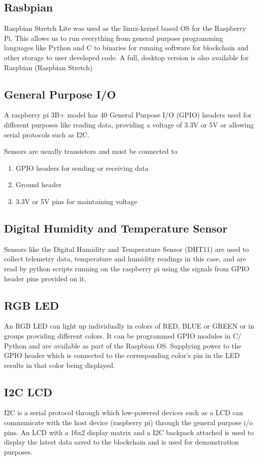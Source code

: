 \documentclass[11pt,openright]{report}
\begin{document}
\subsection{Rasbpian}
Raspbian Stretch Lite was used as the linux-kernel based OS for the Raspberry Pi. This allows us to run everything from general purpose programming languages like Python and C to binaries for running software for blockchain and other storage to user developed code. A full, desktop version is also available for Raspbian (Raspbian Stretch)

\subsection{General Purpose I/O}
A raspberry pi 3B+ model has 40 General Purpose I/O (GPIO) headers used for different purposes like reading data, providing a voltage of 3.3V or 5V or allowing serial protocols such as I2C.

Sensors are usually transistors and must be connected to
\begin{enumerate}
\item GPIO headers for sending or receiving data
\item  Ground header 
\item  3.3V or 5V pins for maintaining voltage
\end{enumerate}

\subsection{Digital Humidity and Temperature Sensor}
Sensors like the Digital Humidity and Temperature Sensor (DHT11) are used to collect telemetry data, temperature and humidity readings in this case, and are read by python scripts running on the raspberry pi using the signals from GPIO header pins provided on it.

\subsection{RGB LED}
An RGB LED can light up individually in colors of RED, BLUE or GREEN or in groups providing different colors. It can be programmed GPIO modules in C/ Python and are available as part of the Raspbian OS. Supplying power to the GPIO header which is connected to the corresponding color’s pin in the LED results in that color being displayed. 

\subsection{I2C LCD}
I2C is a serial protocol through which low-powered devices such as a LCD can communicate with the host device (raspberry pi) through the general purpose i/o pins. 
An LCD with a 16x2 display matrix and a I2C backpack attached is used to display the latest data saved to the blockchain and is used for demonstration purposes. 
\end{document}
